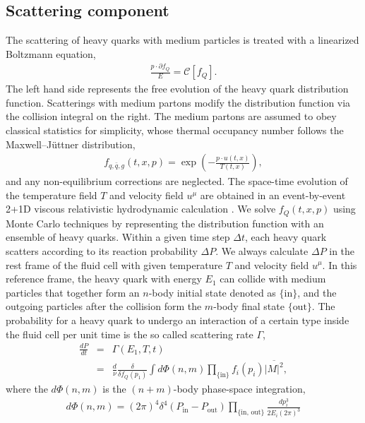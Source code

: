 \documentclass[aps, prc, reprint, amsmath, groupedaddress, nofootinbib]{revtex4-1}
\begin{document}
\subsection{Scattering component}
The scattering of heavy quarks with medium particles is treated with a linearized Boltzmann equation,
\begin{eqnarray}
    \frac{p \cdot \partial f_Q}{E} = \mathcal{C}[f_Q].
\end{eqnarray}
The left hand side represents the free evolution of the heavy quark distribution function. 
Scatterings with medium partons modify the distribution function via the collision integral on the right.
The medium partons are assumed to obey classical statistics for simplicity, whose thermal occupancy number follows the Maxwell--J\"uttner distribution, 
\begin{eqnarray}
f_{q,\bar{q}, g}(t,x,p) = \exp\left(-\frac{p \cdot u(t,x)}{T(t,x)}\right),
\end{eqnarray}
and any non-equilibrium corrections are neglected.
The space-time evolution of the temperature field $T$ and velocity field $u^\mu$ are obtained in an event-by-event 2+1D viscous relativistic hydrodynamic calculation \cite{Heinz:2005bw,Song:2007ux,Shen:2014vra}.
We solve $f_Q(t,x,p)$ using Monte Carlo techniques by representing the distribution function with an ensemble of heavy quarks.
Within a given time step $\Delta t$, each heavy quark scatters according to its reaction probability $\Delta P$.
We always calculate $\Delta P$ in the rest frame of the fluid cell with given temperature $T$ and velocity field $u^\mu$.
In this reference frame, the heavy quark with energy $E_1$ can collide with medium particles that together form an $n$-body initial state denoted as $\{\textrm{in}\}$, and the outgoing particles after the collision form the $m$-body final state $\{\textrm{out}\}$.
The probability for a heavy quark to undergo an interaction of a certain type inside the fluid cell per unit time is the so called scattering rate $\Gamma$,
\begin{eqnarray}\label{eq:rate}
    \frac{dP}{dt} &=& \Gamma(E_1, T, t) \nonumber \\
    &=& \frac{d}{\nu} \frac{\delta}{\delta f_Q(p_1)}\int d\Phi(n,m) \prod_{\textrm{\{in\}}} f_i(p_i) 
\overline{|M|^2},
\end{eqnarray}
where the $d\Phi(n,m)$ is the $(n+m)$-body phase-space integration,
\begin{eqnarray}
\nonumber
d\Phi(n,m) = (2\pi)^4\delta^4\left(P_{\textrm{in}}-P_{\textrm{out}}\right)\prod_{\{\textrm{in, out}\}} \frac{dp_i^3}{2E_i(2\pi)^3} 
\end{eqnarray}
\end{document}
